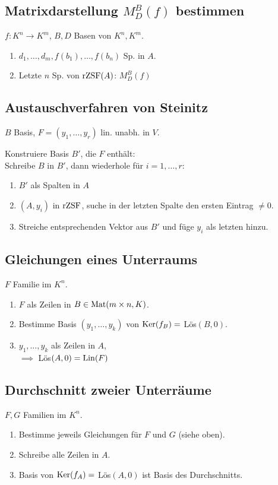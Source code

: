 \subsection*{Matrixdarstellung $M_D^B(f)$ bestimmen}
$f:K^n\to K^m$, $B,D$ Basen von $K^n,K^m$.
\begin{enumerate}
	\item $d_1,\dots,d_m,f(b_1),\dots,f(b_n)$ Sp. in $A$.
	\item Letzte $n$ Sp. von $\operatorname{rZSF}(A)$: $M_D^B(f)$
\end{enumerate}

\subsection*{Austauschverfahren von Steinitz}
$B$ Basis, $F=(y_1,\dots,y_r)$ lin. unabh. in $V$.

Konstruiere Basis $B'$, die $F$ enthält: \\
Schreibe $B$ in $B'$, dann wiederhole für $i=1,\dots,r$:
\begin{enumerate}
	\item $B'$ als Spalten in $A$
	\item $(A,y_i)$ in $\operatorname{rZSF}$, suche in der letzten Spalte den ersten Eintrag $\neq 0$.
	\item Streiche entsprechenden Vektor aus $B'$ und füge $y_i$ als letzten hinzu.
\end{enumerate}

\subsection*{Gleichungen eines Unterraums}
$F$ Familie im $K^n$.

\begin{enumerate}
	\item $F$ als Zeilen in $B\in\operatorname{Mat}(m \times n,K)$.
	\item Bestimme Basis $(y_1,\dots,y_k)$ von $\operatorname{Ker}(f_B)=$ Lös$(B,0)$.
	\item $y_1,\dots,y_k$ als Zeilen in $A$, \\
		$\implies$ Lös$(A,0)=\operatorname{Lin}(F)$ 
\end{enumerate}

\subsection*{Durchschnitt zweier Unterräume}
$F,G$ Familien im $K^n$.
\begin{enumerate}
	\item Bestimme jeweils Gleichungen für $F$ und $G$ (siehe oben).
	\item Schreibe alle Zeilen in $A$.
	\item Basis von $\operatorname{Ker}(f_A)=$ Lös$(A,0)$ ist Basis des Durchschnitts.
\end{enumerate}
